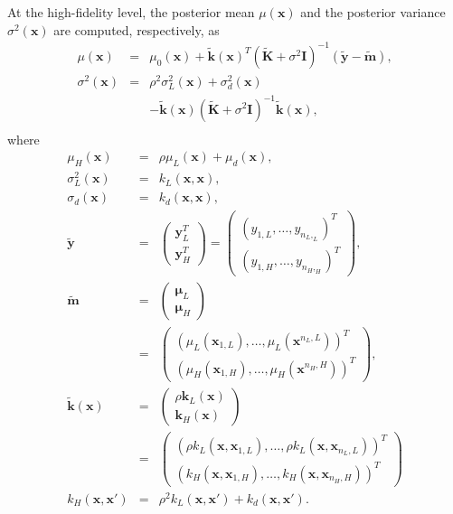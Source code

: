 \documentclass[%
 reprint,
aip,jcp
]{revtex4-1}
\begin{document}
At the high-fidelity level, the posterior mean $\mu (\bm{x})$ and the posterior variance $\sigma^2 (\bm{x})$ are computed, respectively, as
\begin{equation}
\begin{array}{lll}
\mu (\bm{x}) &=& \mu_0 (\bm{x}) + \tilde{\bm{k}} (\bm{x})^T (\tilde{\bm{K}} + \sigma^2 \bm{I})^{-1} (\tilde{\bm{y}} - \tilde{\bm{m}}), \\
\sigma^2 (\bm{x}) &=& \rho^2 \sigma_L^2 (\bm{x}) + \sigma_d^2(\bm{x}) \\
&& - \tilde{\bm{k}}(\bm{x})(\tilde{\bm{K}} + \sigma^2 \bm{I})^{-1} \tilde{\bm{k}}(\bm{x}), \\
\end{array}
\end{equation}
where 
\begin{equation}
\begin{array}{lll}
\mu_H (\bm{x}) &=& \rho \mu_L (\bm{x}) + \mu_d(\bm{x}),\\ \sigma_L^2(\bm{x}) &=& k_L(\bm{x},\bm{x}),\\
\sigma_d (\bm{x}) &=& k_d(\bm{x}, \bm{x}),\\
\tilde{\bm{y}} &=& 
\begin{pmatrix}
\bm{y}_L^T \\ \bm{y}_H^T 
\end{pmatrix} = 
\begin{pmatrix}
\left(y_{1,L}, \dots, y_{n_L,_L}\right)^T \\ 
\left(y_{1,H}, \dots, y_{n_H,_H}\right)^T 
\end{pmatrix}, \\
\tilde{\bm{m}} &=& 
\begin{pmatrix} \bm{\mu}_L \\ \bm{\mu}_H \end{pmatrix} \\
&=& \begin{pmatrix} 
\left( \mu_L(\bm{x}_{1,L}), \dots, \mu_L(\bm{x}^{n_L,L}) \right)^T \\
\left( \mu_H(\bm{x}_{1,H}), \dots, \mu_H(\bm{x}^{n_H,H}) \right)^T
\end{pmatrix}, \\
\tilde{\bm{k}} (\bm{x}) &=& 
\begin{pmatrix} \rho \bm{k}_L (\bm{x}) \\ \bm{k}_H (\bm{x}) \end{pmatrix} \\
&=& \begin{pmatrix} 
\left( \rho k_L(\bm{x}, \bm{x}_{1,L}), \dots, \rho k_L(\bm{x}, \bm{x}_{n_L,L}) \right)^T \\
\left(      k_H(\bm{x}, \bm{x}_{1,H}), \dots,      k_H(\bm{x}, \bm{x}_{n_H,H}) \right)^T
\end{pmatrix}\\
k_H (\bm{x}, \bm{x'}) &=& \rho^2 k_L(\bm{x}, \bm{x'}) + k_d(\bm{x}, \bm{x'}).\\
\end{array}
\end{equation}
\end{document}
